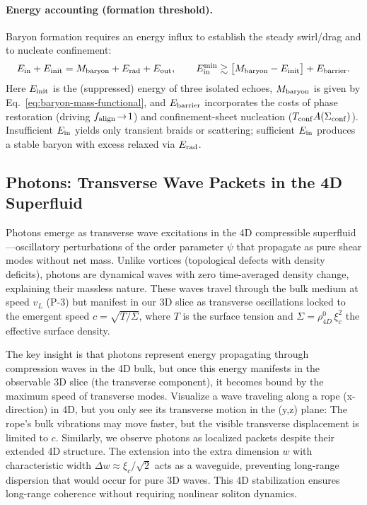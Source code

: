 \paragraph{Energy accounting (formation threshold).}
Baryon formation requires an energy influx to establish the steady swirl/drag and to nucleate confinement:
\[
E_{\rm in}+E_{\rm init}=M_{\rm baryon}+E_{\rm rad}+E_{\rm out},\qquad
E_{\rm in}^{\rm min}\gtrsim \big[M_{\rm baryon}-E_{\rm init}\big]+E_{\rm barrier}.
\]
Here $E_{\rm init}$ is the (suppressed) energy of three isolated echoes, 
$M_{\rm baryon}$ is given by Eq.~\eqref{eq:baryon-mass-functional}, 
and $E_{\rm barrier}$ incorporates the costs of phase restoration (driving $f_{\rm align}\!\to\!1$) and confinement-sheet nucleation ($T_{\rm conf}A(\Sigma_{\rm conf})$). 
Insufficient $E_{\rm in}$ yields only transient braids or scattering; sufficient $E_{\rm in}$ produces a stable baryon with excess relaxed via $E_{\rm rad}$.

\subsection{Photons: Transverse Wave Packets in the 4D Superfluid}

Photons emerge as transverse wave excitations in the 4D compressible superfluid---oscillatory perturbations of the order parameter $\psi$ that propagate as pure shear modes without net mass. Unlike vortices (topological defects with density deficits), photons are dynamical waves with zero time-averaged density change, explaining their massless nature. These waves travel through the bulk medium at speed $v_L$ (P-3) but manifest in our 3D slice as transverse oscillations locked to the emergent speed $c = \sqrt{T/\Sigma}$, where $T$ is the surface tension and $\Sigma = \rho_{4D}^0 \, \xi_c^2$ the effective surface density.

The key insight is that photons represent energy propagating through compression waves in the 4D bulk, but once this energy manifests in the observable 3D slice (the transverse component), it becomes bound by the maximum speed of transverse modes. Visualize a wave traveling along a rope (x-direction) in 4D, but you only see its transverse motion in the (y,z) plane: The rope's bulk vibrations may move faster, but the visible transverse displacement is limited to $c$. Similarly, we observe photons as localized packets despite their extended 4D structure. The extension into the extra dimension $w$ with characteristic width $\Delta w \approx \xi_c/\sqrt{2}$ acts as a waveguide, preventing long-range dispersion that would occur for pure 3D waves. This 4D stabilization ensures long-range coherence without requiring nonlinear soliton dynamics.

